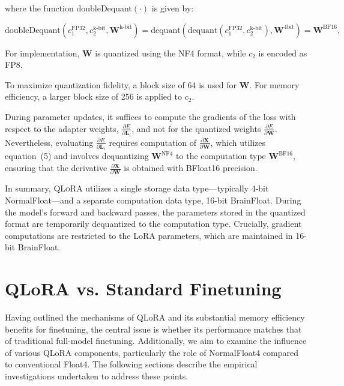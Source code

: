 where the function doubleDequant$(\cdot)$ is given by:

\begin{equation}
    \text{doubleDequant}(c_1^{\text{FP32}}, c_2^{\text{k-bit}}, \mathbf{W}^{\text{k-bit}}) = \text{dequant}(\text{dequant}(c_1^{\text{FP32}}, c_2^{\text{k-bit}}), \mathbf{W}^{\text{4bit}}) = \mathbf{W}^{\text{BF16}},
\end{equation}

For implementation, $\mathbf{W}$ is quantized using the NF4 format, while $c_2$ is encoded as FP8.

To maximize quantization fidelity, a block size of 64 is used for $\mathbf{W}$. For memory efficiency, a larger block size of 256 is applied to $c_2$.

During parameter updates, it suffices to compute the gradients of the loss with respect to the adapter weights, $\frac{\partial E}{\partial \mathbf{L}_i}$, and not for the quantized weights $\frac{\partial E}{\partial \mathbf{W}}$. Nevertheless, evaluating $\frac{\partial E}{\partial \mathbf{L}_i}$ requires computation of $\frac{\partial \mathbf{X}}{\partial \mathbf{W}}$, which utilizes equation~(5) and involves dequantizing $\mathbf{W}^{\text{NF4}}$ to the computation type $\mathbf{W}^{\text{BF16}}$, ensuring that the derivative $\frac{\partial \mathbf{X}}{\partial \mathbf{W}}$ is obtained with BFloat16 precision.

In summary, \textsc{QLoRA} utilizes a single storage data type—typically 4-bit NormalFloat—and a separate computation data type, 16-bit BrainFloat. During the model's forward and backward passes, the parameters stored in the quantized format are temporarily dequantized to the computation type. Crucially, gradient computations are restricted to the LoRA parameters, which are maintained in 16-bit BrainFloat.

\section{QLoRA vs. Standard Finetuning}
\label{sec:comp_to_std}

Having outlined the mechanisms of QLoRA and its substantial memory efficiency benefits for finetuning, the central issue is whether its performance matches that of traditional full-model finetuning. Additionally, we aim to examine the influence of various QLoRA components, particularly the role of NormalFloat4 compared to conventional Float4. The following sections describe the empirical investigations undertaken to address these points.

